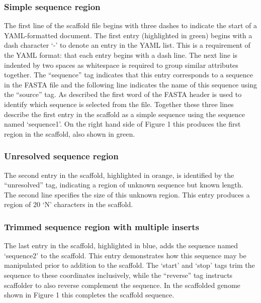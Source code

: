 \documentclass[10pt]{bmc_article}
\newenvironment{bmcformat}{\begin{raggedright}\baselineskip20pt\sloppy\setboolean{publ}{false}}{\end{raggedright}\baselineskip20pt\sloppy}
\begin{document}
\begin{bmcformat}
\subsubsection*{Simple sequence region} %

The first line of the scaffold file begins with three dashes to indicate the
start of a YAML-formatted document. The first entry (highlighted in green)
begins with a dash character `-' to denote an entry in the YAML list. This is
a requirement of the YAML format: that each entry begins with a dash line. The
next line is indented by two spaces as whitespace is required to group similar
attributes together. The ``sequence'' tag indicates that this entry corresponds
to a sequence in the FASTA file and the following line indicates the name of
this sequence using the ``source'' tag. As described the first word of the
FASTA header is used to identify which sequence is selected from the file.
Together these three lines describe the first entry in the scaffold as a simple
sequence using the sequence named `sequence1'. On the right hand side of Figure
1 this produces the first region in the scaffold, also shown in green. \pb

\subsubsection*{Unresolved sequence region} %

The second entry in the scaffold, highlighted in orange, is identified by the
``unresolved'' tag, indicating a region of unknown sequence but known length.
The second line specifies the size of this unknown region. This entry produces
a region of 20 `N' characters in the scaffold. \pb

\subsubsection*{Trimmed sequence region with multiple inserts} %

The last entry in the scaffold, highlighted in blue, adds the sequence named
`sequence2' to the scaffold. This entry demonstrates how this sequence may be
manipulated prior to addition to the scaffold. The `start' and `stop' tags trim
the sequence to these coordinates inclusively, while the ``reverse'' tag
instructs scaffolder to also reverse complement the sequence. In the scaffolded
genome shown in Figure 1 this completes the scaffold sequence. \pb


\end{bmcformat}
\end{document}
